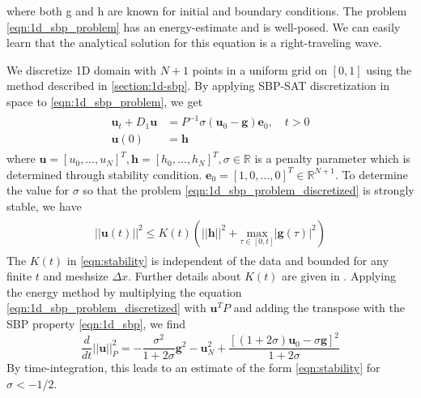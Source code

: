 where both g and h are known for initial and boundary conditions. The problem \autoref{eqn:1d_sbp_problem} has an energy-estimate and is well-posed. We can easily learn that the analytical solution for this equation is a right-traveling wave.

We discretize 1D domain with $N+1$ points in a uniform grid on $[0,1]$ using the method described in \autoref{section:1d-sbp}. By applying SBP-SAT discretization in space to \autoref{eqn:1d_sbp_problem}, we get
\begin{align}
    \begin{split}
        \boldsymbol{u}_t + D_1\boldsymbol{u} &= P^{-1}\sigma(\boldsymbol{u}_0 - \boldsymbol{g}) \boldsymbol{e}_0, \quad t > 0\\
        \boldsymbol{u}(0) &= \boldsymbol{h}
    \end{split}
    \label{eqn:1d_sbp_problem_discretized}
\end{align}
where $\boldsymbol{u} = [u_0,\dots,u_N]^T, \boldsymbol{h} = [h_0,\dots,h_N]^T, \sigma \in \mathbb{R}$ is a penalty parameter which is determined through stability condition. $\boldsymbol{e}_0 = [1,0,\dots,0]^T\in\mathbb{R}^{N+1}$. To determine the value for $\sigma$ so that the problem \autoref{eqn:1d_sbp_problem_discretized} is strongly stable, we have 
\begin{align}
    \begin{split}
        ||\boldsymbol{u}(t)||^2 \leq K(t)(||\boldsymbol{h}||^2 + \underset{\tau \in [0,t]}{\text{max}}|\boldsymbol{g}(\tau)|^2)
    \end{split}
    \label{eqn:stability}
\end{align}
The $K(t)$ in \autoref{eqn:stability} is independent of the data and bounded for any finite $t$ and meshsize $\Delta x$. Further details about $K(t)$ are given in \cite{SVARD201417,gustafsson1995time}.
Applying the energy method by multiplying the equation \autoref{eqn:1d_sbp_problem_discretized} with $\boldsymbol{u}^TP$ and adding the transpose with the SBP property \autoref{eqn:1d_sbp}, we find
\begin{equation}
    \frac{d}{dt}||\boldsymbol{u}||_P^2 = - \frac{\sigma^2}{1+2\sigma}\boldsymbol{g}^2 - \boldsymbol{u}_N^2 + \frac{[(1+2\sigma)\boldsymbol{u}_0 - \sigma\boldsymbol{g}]^2}{1+2\sigma}
\end{equation}
By time-integration, this leads to an estimate of the form \autoref{eqn:stability} for $\sigma < -1/2$.

